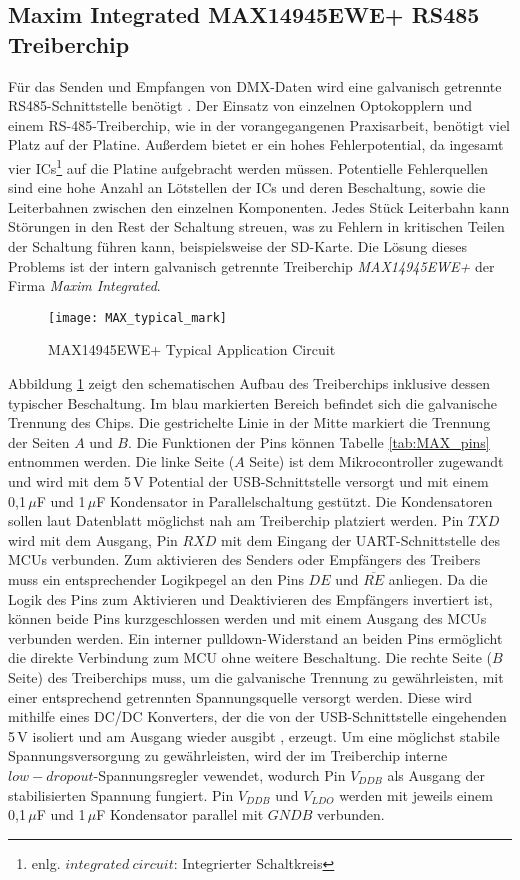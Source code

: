\newpage
\subsection{Maxim Integrated MAX14945EWE+ RS485 Treiberchip}

Für das Senden und Empfangen von DMX-Daten wird eine galvanisch getrennte RS485-Schnittstelle benötigt \cite[S.6-8]{Bauer2021}. Der Einsatz von einzelnen Optokopplern und einem RS-485-Treiberchip, wie in der vorangegangenen Praxisarbeit, benötigt viel Platz auf der Platine. Außerdem bietet er ein hohes Fehlerpotential, da ingesamt vier ICs\footnote{enlg. $integrated\ circuit$: Integrierter Schaltkreis} auf die Platine aufgebracht werden müssen. Potentielle Fehlerquellen sind eine hohe Anzahl an Lötstellen der ICs und deren Beschaltung, sowie die Leiterbahnen zwischen den einzelnen Komponenten. Jedes Stück Leiterbahn kann Störungen in den Rest der Schaltung streuen, was zu Fehlern in kritischen Teilen der Schaltung führen kann, beispielsweise der SD-Karte. Die Lösung dieses Problems ist der intern galvanisch getrennte Treiberchip \textit{MAX14945EWE+} der Firma \textit{Maxim Integrated}.
\begin{figure}[h]
	\begin{center}
		\texttt{[image: MAX\_typical\_mark]}
		\caption{MAX14945EWE+ Typical Application Circuit \cite[s.19]{MAX14945MN}}
		\label{fig:MAXfd}
	\end{center}
\end{figure}
Abbildung \ref{fig:MAXfd} zeigt den schematischen Aufbau des Treiberchips inklusive dessen typischer Beschaltung. Im blau markierten Bereich befindet sich die galvanische Trennung des Chips. Die gestrichelte Linie in der Mitte markiert die Trennung der Seiten $A$ und $B$. Die Funktionen der Pins können Tabelle \ref{tab:MAX_pins} entnommen werden. Die linke Seite ($A$ Seite) ist dem Mikrocontroller zugewandt und wird mit dem 5\,V Potential der USB-Schnittstelle versorgt und mit einem 0,1\,$\mu$F und 1\,$\mu$F Kondensator in Parallelschaltung gestützt. Die Kondensatoren sollen laut Datenblatt möglichst nah am Treiberchip platziert werden. Pin $TXD$ wird mit dem Ausgang, Pin $RXD$ mit dem Eingang der UART-Schnittstelle des MCUs verbunden. Zum aktivieren des Senders oder Empfängers des Treibers muss ein entsprechender Logikpegel an den Pins $DE$ und $\overline{RE}$ anliegen. Da die Logik des Pins zum Aktivieren und Deaktivieren des Empfängers invertiert ist, können beide Pins kurzgeschlossen werden und mit einem Ausgang des MCUs verbunden werden. Ein interner pulldown-Widerstand an beiden Pins ermöglicht die direkte Verbindung zum MCU ohne weitere Beschaltung. Die rechte Seite ($B$ Seite) des Treiberchips muss, um die galvanische Trennung zu gewährleisten, mit einer entsprechend getrennten Spannungsquelle versorgt werden. Diese wird mithilfe eines DC/DC Konverters, der die von der USB-Schnittstelle eingehenden 5\,V isoliert und am Ausgang wieder ausgibt \cite{DC_MN}, erzeugt. Um eine möglichst stabile Spannungsversorgung zu gewährleisten, wird der im Treiberchip interne $low-dropout$-Spannungsregler vewendet, wodurch Pin $V_{DDB}$ als Ausgang der stabilisierten Spannung fungiert. Pin $V_{DDB}$ und $V_{LDO}$ werden mit jeweils einem 0,1\,$\mu$F und 1\,$\mu$F Kondensator parallel mit $GNDB$ verbunden.

